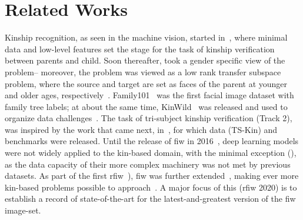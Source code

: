 \section{Related Works}
Kinship recognition, as seen in the machine vision, started in~\cite{fang2010towards}, where minimal data and low-level features set the stage for the task of kinship verification between parents and child. Soon thereafter, \cite{xia2012understanding} took a gender specific view of the problem-- moreover, the problem was viewed as a low rank transfer subspace problem, where the source and target are set as faces of the parent at younger and older ages, respectively~\cite{shao2012low}. Family101~\cite{fang2013kinship} was the first facial image dataset with family tree labels; at about the same time, KinWild~\cite{lu2014neighborhood} was released and used to organize data challenges~\cite{lu2015fg}. The task of tri-subject kinship verification (\ie Track 2), was inspired by the work that came next, in~\cite{qin2015tri}, for which data (\ie TS-Kin) and benchmarks were released. Until the release of \ac{fiw} in 2016~\cite{robinson2016families}, deep learning models were not widely applied to the kin-based domain, with the minimal exception (\ie \cite{zhang12kinship}), as the data capacity of their more complex machinery was not met by previous datasets. 
As part of the first \ac{rfiw}~\cite{robinson2017recognizing}), 
\ac{fiw} was further extended~\cite{robinson2018visual, wang2017kinship}, making ever more kin-based problems possible to approach~\cite{gao2019will, mingaaai2020}. A major focus of this (\ie \ac{rfiw} 2020) is to establish a record of state-of-the-art for the latest-and-greatest version of the \ac{fiw} image-set.